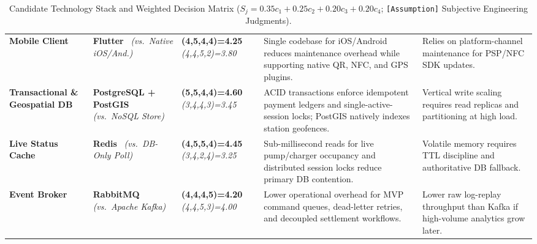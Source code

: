 \begin{table}[!htbp]
  \centering
  \caption{Candidate Technology Stack and Weighted Decision Matrix ($S_j = 0.35 c_1 + 0.25 c_2 + 0.20 c_3 + 0.20 c_4$; \texttt{[Assumption]} Subjective Engineering Judgments).}
  \label{tab:tech-tradeoffs}
  \small
  \begin{tabularx}{\linewidth}{@{}P{21mm} P{27mm} P{21mm} L P{29mm}@{}}
    \toprule
     &  &  &  &  \\
    \midrule
    \textbf{Mobile Client} & \textbf{Flutter}~\cite{flutter2025docs} \newline \emph{(vs.\ Native iOS/And.)} & \textbf{(4,5,4,4)=4.25} \newline \emph{(4,4,5,2)=3.80} & Single codebase for iOS/Android reduces maintenance overhead while supporting native QR, NFC, and GPS plugins. & Relies on platform-channel maintenance for PSP/NFC SDK updates. \\
    \textbf{Transactional \& Geospatial DB} & \textbf{PostgreSQL + PostGIS}~\cite{postgis2025docs} \newline \emph{(vs.\ NoSQL Store)} & \textbf{(5,5,4,4)=4.60} \newline \emph{(3,4,4,3)=3.45} & ACID transactions enforce idempotent payment ledgers and single-active-session locks; PostGIS natively indexes station geofences. & Vertical write scaling requires read replicas and partitioning at high load. \\
    \textbf{Live Status Cache} & \textbf{Redis}~\cite{redis2025docs} \newline \emph{(vs.\ DB-Only Poll)} & \textbf{(4,5,5,4)=4.45} \newline \emph{(3,4,2,4)=3.25} & Sub-millisecond reads for live pump/charger occupancy and distributed session locks reduce primary DB contention. & Volatile memory requires TTL discipline and authoritative DB fallback. \\
    \textbf{Event Broker} & \textbf{RabbitMQ}~\cite{rabbitmq2025docs} \newline \emph{(vs.\ Apache Kafka)} & \textbf{(4,4,4,5)=4.20} \newline \emph{(4,4,5,3)=4.00} & Lower operational overhead for MVP command queues, dead-letter retries, and decoupled settlement workflows. & Lower raw log-replay throughput than Kafka if high-volume analytics grow later. \\
    \bottomrule
  \end{tabularx}
\end{table}
